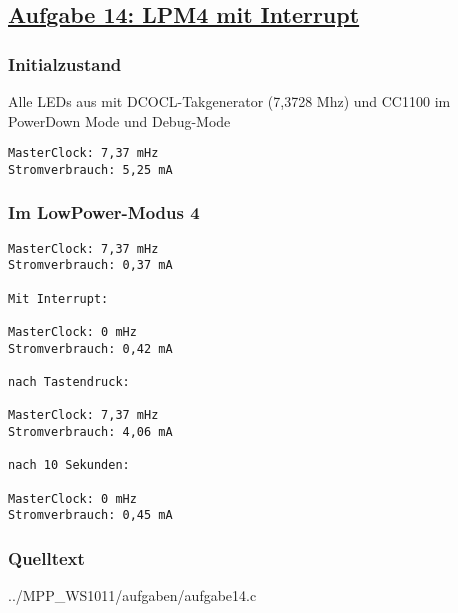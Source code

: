 \subsection*
{\href{http://cst.mi.fu-berlin.de/intern/19606-P-MPP/Aufgaben/040501.html}
{Aufgabe 14: LPM4 mit Interrupt}}

\subsubsection*{Initialzustand}
Alle LEDs aus mit DCOCL-Takgenerator (7,3728 Mhz) und CC1100 im PowerDown Mode und Debug-Mode

\begin{verbatim}
MasterClock: 7,37 mHz
Stromverbrauch: 5,25 mA
\end{verbatim}

\subsubsection*{Im LowPower-Modus 4}
\begin{verbatim}
MasterClock: 7,37 mHz
Stromverbrauch: 0,37 mA

Mit Interrupt:

MasterClock: 0 mHz
Stromverbrauch: 0,42 mA

nach Tastendruck:

MasterClock: 7,37 mHz
Stromverbrauch: 4,06 mA

nach 10 Sekunden:

MasterClock: 0 mHz
Stromverbrauch: 0,45 mA
\end{verbatim}

\subsubsection*{Quelltext}

{../MPP_WS1011/aufgaben/aufgabe14.c}
